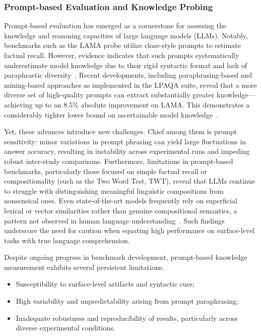 \subsubsection{Prompt-based Evaluation and Knowledge Probing}

Prompt-based evaluation has emerged as a cornerstone for assessing the knowledge and reasoning capacities of large language models (LLMs). Notably, benchmarks such as the LAMA probe utilize cloze-style prompts to estimate factual recall. However, evidence indicates that such prompts systematically underestimate model knowledge due to their rigid syntactic format and lack of paraphrastic diversity~\cite{ref98}. Recent developments, including paraphrasing-based and mining-based approaches as implemented in the LPAQA suite, reveal that a more diverse set of high-quality prompts can extract substantially greater knowledge---achieving up to an 8.5\% absolute improvement on LAMA. This demonstrates a considerably tighter lower bound on ascertainable model knowledge~\cite{ref98}.

Yet, these advances introduce new challenges. Chief among them is prompt sensitivity: minor variations in prompt phrasing can yield large fluctuations in answer accuracy, resulting in instability across experimental runs and impeding robust inter-study comparisons. Furthermore, limitations in prompt-based benchmarks, particularly those focused on simple factual recall or compositionality (such as the Two Word Test, TWT), reveal that LLMs continue to struggle with distinguishing meaningful linguistic compositions from nonsensical ones. Even state-of-the-art models frequently rely on superficial lexical or vector similarities rather than genuine compositional semantics, a pattern not observed in human language understanding~\cite{ref96}. Such findings underscore the need for caution when equating high performance on surface-level tasks with true language comprehension.

Despite ongoing progress in benchmark development, prompt-based knowledge measurement exhibits several persistent limitations:

\begin{itemize}
    \item Susceptibility to surface-level artifacts and syntactic cues;
    \item High variability and unpredictability arising from prompt paraphrasing;
    \item Inadequate robustness and reproducibility of results, particularly across diverse experimental conditions.
\end{itemize}

